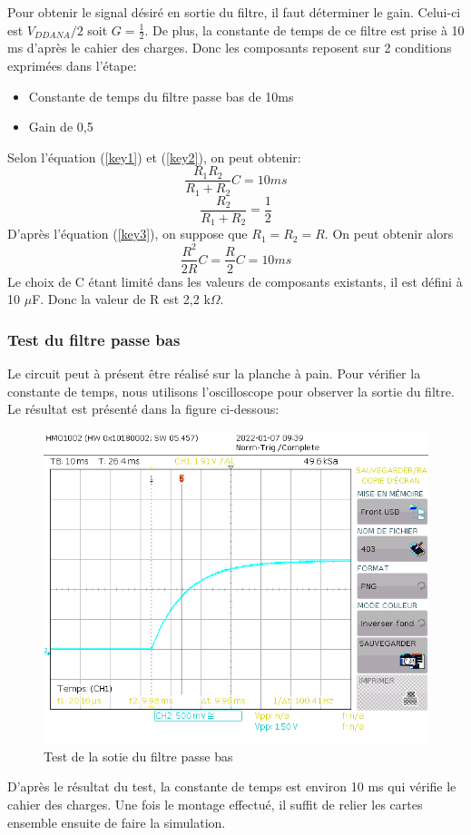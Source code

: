 \documentclass[a4paper]{article}
\begin{document}
	Pour obtenir le signal désiré en sortie du filtre, il faut déterminer le gain. Celui-ci est $V_{DDANA}/2$ soit $G={\frac 12}$. De plus, la constante de temps de ce filtre est prise à 10 ms d’après le cahier des charges. Donc les composants reposent sur 2 conditions exprimées dans l’étape:
	\begin{itemize}
		\item {Constante de temps du filtre passe bas de 10ms }
		\item {Gain de 0,5}
	\end{itemize}
	Selon l'équation (\ref{key1}) et (\ref{key2}), on peut obtenir:
    \begin{equation}
		{\frac {R_{1}R_{2}} {R_{1}+R_{2}}}C = 10 ms
	\end{equation}
	\begin{equation}\label{key3}
		{\frac {R_{2}} {R_{1}+R_{2}}} = {\frac {1}{2}}
	\end{equation}
	D'après l'équation (\ref{key3}), on suppose que $R_{1}=R_{2}=R$. On peut obtenir alors 
	 \begin{equation}
		{\frac {R^2}{2R}} C={\frac {R}{2}}C = 10 ms
	\end{equation}
	Le choix de C étant limité dans les valeurs de composants existants, il est défini à 10 $\mu$F. Donc la valeur de R est 2,2 k$\Omega$. 
	\subsubsection{Test du filtre passe bas}
	Le circuit peut à présent être réalisé sur la planche à pain. Pour vérifier la constante de temps, nous utilisons l'oscilloscope pour observer la sortie du filtre. Le résultat est présenté dans la figure ci-dessous:
	\begin{figure}[H]
	\centering
	\includegraphics[width=0.8\linewidth]{test_filtre passe bas.PNG}
	\caption{Test de la sotie du filtre passe bas}
    \end{figure}
	D'après le résultat du test, la constante de temps est environ 10 ms qui vérifie le cahier des charges. Une fois le montage effectué, il suffit de relier les cartes ensemble ensuite de faire la simulation.
	\newpage
\end{document}
